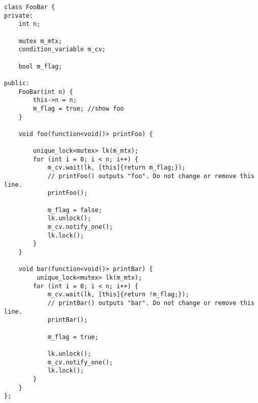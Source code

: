 \setcounter{lstlisting}{0}
\begin{lstlisting}[style=customc, caption={Condition Variable}]
class FooBar {
private:
    int n;
    
    mutex m_mtx;
    condition_variable m_cv;
    
    bool m_flag;

public:
    FooBar(int n) {
        this->n = n;
        m_flag = true; //show foo
    }

    void foo(function<void()> printFoo) {
        
        unique_lock<mutex> lk(m_mtx);
        for (int i = 0; i < n; i++) {
            m_cv.wait(lk, [this]{return m_flag;});
        	// printFoo() outputs "foo". Do not change or remove this line.
        	printFoo();
            
            m_flag = false;
            lk.unlock();
            m_cv.notify_one();
            lk.lock();
        }
    }

    void bar(function<void()> printBar) {
         unique_lock<mutex> lk(m_mtx);
        for (int i = 0; i < n; i++) {
            m_cv.wait(lk, [this]{return !m_flag;});
        	// printBar() outputs "bar". Do not change or remove this line.
        	printBar();
            
            m_flag = true;
            
            lk.unlock();
            m_cv.notify_one();
            lk.lock();
        }
    }
};
\end{lstlisting}